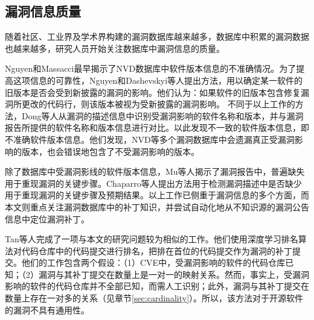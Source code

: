 \subsection{漏洞信息质量}
随着社区、工业界及学术界构建的漏洞数据库越来越多，数据库中积累的漏洞数据也越来越多，研究人员开始关注数据库中漏洞信息的质量。

Nguyen和Massacci\cite{nguyen2013reliability}最早揭示了NVD数据库中软件版本信息的不准确情况。为了提高这项信息的可靠性，Nguyen\cite{nguyen2016automatic}和Dashevskyi等人\cite{dashevskyi2018screening}提出方法，用以确定某一软件的旧版本是否会受到新披露的漏洞的影响。他们认为：如果软件的旧版本包含修复漏洞所更改的代码行，则该版本被视为受新披露的漏洞影响。
不同于以上工作的方法，Dong等人\cite{dong2019towards}从漏洞的描述信息中识别受漏洞影响的软件名称和版本，并与漏洞报告所提供的软件名称和版本信息进行对比。以此发现不一致的软件版本信息，即不准确软件版本信息。他们发现，NVD等多个漏洞数据库中会遗漏真正受漏洞影响的版本，也会错误地包含了不受漏洞影响的版本。

除了数据库中受漏洞影线的软件版本信息，Mu等人\cite{mu2018understanding}揭示了漏洞报告中，普遍缺失用于重现漏洞的关键步骤。Chaparro等人\cite{chaparro2017detecting}提出方法用于检测漏洞描述中是否缺少用于重现漏洞的关键步骤及预期结果。以上工作已侧重于漏洞信息的多个方面，而本文则重点关注漏洞数据库中的补丁知识，并尝试自动化地从不知识源的漏洞公告信息中定位漏洞补丁。

Tan等人完成了一项与本文的研究问题较为相似的工作\cite{Tan2021locating}。他们使用深度学习排名算法对代码仓库中的代码提交进行排名，把排在首位的代码提交作为漏洞的补丁提交。他们的工作包含两个假设：（1）CVE中，受漏洞影响的软件的代码仓库已知；（2）漏洞与其补丁提交在数量上是一对一的映射关系。然而，事实上，受漏洞影响的软件的代码仓库并不全部已知，而需人工识别；此外，漏洞与其补丁提交在数量上存在一对多的关系（见章节\ref{sec:cardinality}）。所以，该方法对于开源软件的漏洞不具有通用性。



